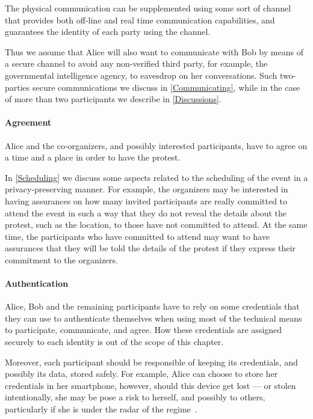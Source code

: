 The physical communication can be supplemented using some sort of channel that provides 
both off-line and real time communication capabilities, and guarantees the identity 
of each party using the channel.

Thus we assume that Alice will also want to communicate with Bob by means of a secure 
channel to avoid any non-verified third party, for example, the governmental intelligence 
agency, to eavesdrop on her conversations. Such two-parties secure communications 
we discuss in \cref{Communicating}, while in the case of more than two participants 
we describe in \cref{Discussions}.

\paragraph{Agreement}
Alice and the co-organizers, and possibly interested participants, have to agree 
on a time and a place in order to have the protest.

In \cref{Scheduling} we discuss some aspects related to the scheduling of the event 
in a privacy-preserving manner. For example, the organizers may be interested in 
having assurances on how many invited participants are really committed to attend 
the event in such a way that they do not reveal the details about the protest, such 
as the location, to those have not committed to attend. At the same time, the participants 
who have committed to attend may want to have assurances that they will be told 
the details of the protest if they express their commitment to the organizers.

\paragraph{Authentication}
Alice, Bob and the remaining participants have to rely on some credentials that 
they can use to authenticate themselves when using most of the technical means to 
participate, communicate, and agree. How these credentials are assigned securely 
to each identity is out of the scope of this chapter.

Moreover, each participant should be responsible of keeping its credentials, and 
possibly its data, stored safely. For example, Alice can choose to store her credentials 
in her smartphone, however, should this device get lost --- or stolen intentionally, 
she may be pose a risk to herself, and possibly to others, particularly if she is 
under the radar of the regime~\cite{AppleVsFBI}.

